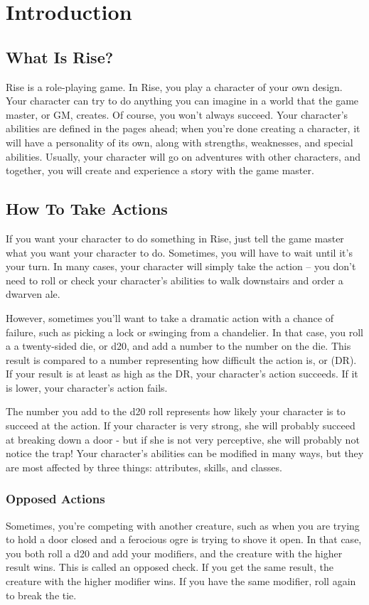 \chapter{Introduction}

\section{What Is Rise?}
Rise is a role-playing game.
In Rise, you play a character of your own design.
Your character can try to do anything you can imagine in a world that the game master, or GM, creates.
Of course, you won't always succeed.
Your character's abilities are defined in the pages ahead; when you're done creating a character, it will have a personality of its own, along with strengths, weaknesses, and special abilities.
Usually, your character will go on adventures with other characters, and together, you will create and experience a story with the game master.

\section{How To Take Actions}

If you want your character to do something in Rise, just tell the game master what you want your character to do.
Sometimes, you will have to wait until it's your turn.
In many cases, your character will simply take the action -- you don't need to roll or check your character's abilities to walk downstairs and order a dwarven ale.

However, sometimes you'll want to take a dramatic action with a chance of failure, such as picking a lock or swinging from a chandelier.
In that case, you roll a a twenty-sided die, or d20, and add a number to the number on the die.
This result is compared to a number representing how difficult the action is, or  (DR).
If your result is at least as high as the DR, your character's action succeeds.
If it is lower, your character's action fails.

The number you add to the d20 roll represents how likely your character is to succeed at the action.
If your character is very strong, she will probably succeed at breaking down a door - but if she is not very perceptive, she will probably not notice the trap! Your character's abilities can be modified in many ways, but they are most affected by three things: attributes, skills, and classes.

\subsection{Opposed Actions}
Sometimes, you're competing with another creature, such as when you are trying to hold a door closed and a ferocious ogre is trying to shove it open.
In that case, you both roll a d20 and add your modifiers, and the creature with the higher result wins.
This is called an opposed check.
If you get the same result, the creature with the higher modifier wins.
If you have the same modifier, roll again to break the tie.

